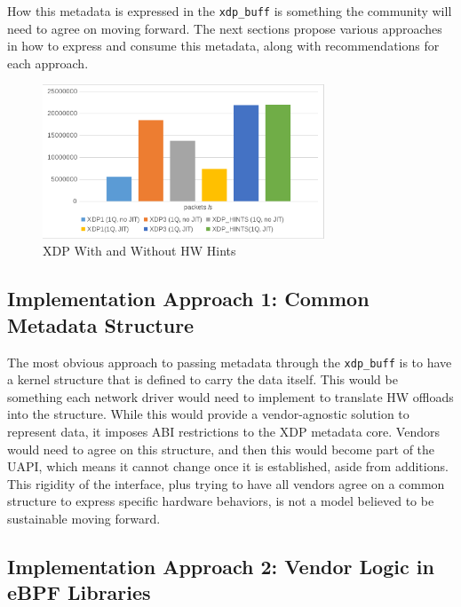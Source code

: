 \documentclass[letterpaper]{article}
\begin{document}
\newline
\indent How this metadata is expressed in the {\small \texttt{xdp\_buff}} is something the community will need to agree on moving forward. The next sections propose various approaches in how to express and consume this metadata, along with recommendations for each approach.
\begin{figure}[h]
\includegraphics[width=3.31in]{xdp-programs-performance.png}
\caption{XDP With and Without HW Hints}
\label{xdp-performance}
\end{figure}

\subsection{Implementation Approach 1: Common Metadata Structure}

The most obvious approach to passing metadata through the {\small \texttt{xdp\_buff}} is to have a kernel structure that is defined to carry the data itself. This would be something each network driver would need to implement to translate HW offloads into the structure. While this would provide a vendor-agnostic solution to represent data, it imposes ABI restrictions to the XDP metadata core. Vendors would need to agree on this structure, and then this would become part of the UAPI, which means it cannot change once it is established, aside from additions. This rigidity of the interface, plus trying to have all vendors agree on a common structure to express specific hardware behaviors, is not a model believed to be sustainable moving forward.

\subsection{Implementation Approach 2: Vendor Logic in eBPF Libraries}
\end{document}

